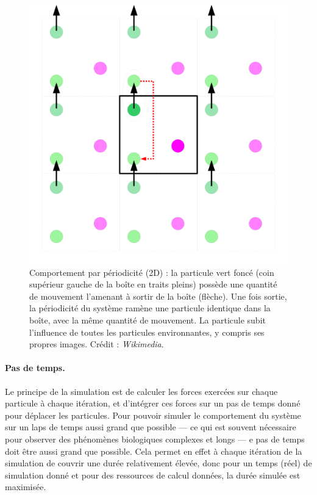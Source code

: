 	\begin{figure}[H]
		\centering
		\includegraphics[width=\textwidth]{figures/ch1/period}
		\caption{Comportement par périodicité (2D) : la particule vert foncé (coin supérieur gauche de la boîte en traits pleins) possède une quantité de mouvement l'amenant à sortir de la boîte (flèche). Une fois sortie, la périodicité du système ramène une particule identique dans la boîte, avec la même quantité de mouvement. La particule subit l'influence de toutes les particules environnantes, y compris ses propres images. Crédit : \emph{Wikimedia}.}
		\label{fig:period}
	\end{figure}
	
	\paragraph{Pas de temps.} Le principe de la simulation est de calculer les forces exercées sur chaque particule à chaque itération, et d'intégrer ces forces sur un pas de temps donné pour déplacer les particules. Pour pouvoir simuler le comportement du système sur un laps de temps aussi grand que possible --- ce qui est souvent nécessaire pour observer des phénomènes biologiques complexes et longs --- e pas de temps doit être aussi grand que possible. Cela permet en effet à chaque itération de la simulation de couvrir une durée relativement élevée, donc pour un temps (réel) de simulation donné et pour des ressources de calcul données, la durée simulée est maximisée.
	
